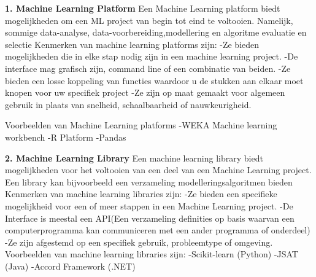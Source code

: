 \textbf{1. Machine Learning Platform} \newline
Een Machine Learning platform biedt mogelijkheden om een ML project van begin tot eind te voltooien. Namelijk, sommige data-analyse, data-voorbereiding,modellering en algoritme evaluatie en selectie
Kenmerken van machine learning platforms zijn:\newline
-Ze bieden mogelijkheden die in elke stap nodig zijn in een machine learning project.\newline
-De interface mag grafisch zijn, command line of een combinatie van beiden.\newline
-Ze bieden een losse koppeling van functies waardoor u de stukken aan elkaar moet knopen voor uw specifiek project \newline
-Ze zijn op maat gemaakt voor algemeen gebruik in plaats van snelheid, schaalbaarheid of nauwkeurigheid.\newline

Voorbeelden van Machine Learning platforms\newline
-WEKA Machine learning workbench\newline
-R Platform\newline
-Pandas \newline

\textbf{2. Machine Learning Library} \newline
Een machine learning library biedt mogelijkheden voor het voltooien van een deel van een Machine Learning project. Een library kan bijvoorbeeld een verzameling modelleringsalgoritmen bieden
Kenmerken van machine learning libraries zijn:\newline
-Ze bieden een specifieke mogelijkheid voor een of meer stappen in een Machine Learning project.\newline
-De Interface is meestal een API(Een verzameling definities op basis waarvan een computerprogramma kan communiceren met een ander programma of onderdeel)\newline
-Ze zijn afgestemd op een specifiek gebruik, probleemtype of omgeving.\newline
Voorbeelden van machine learning libraries zijn:\newline
-Scikit-learn (Python)\newline
-JSAT (Java)\newline
-Accord Framework (.NET)

